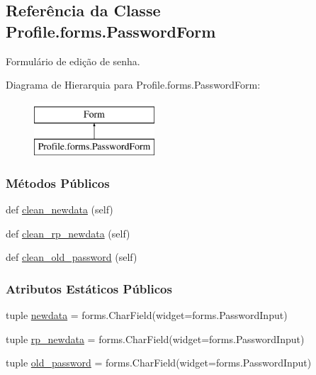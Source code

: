 \hypertarget{classProfile_1_1forms_1_1PasswordForm}{}\subsection{Referência da Classe Profile.\+forms.\+Password\+Form}
\label{classProfile_1_1forms_1_1PasswordForm}


Formulário de edição de senha.  


Diagrama de Hierarquia para Profile.\+forms.\+Password\+Form\+:\begin{figure}[H]
\begin{center}
\leavevmode
\includegraphics[height=2.000000cm]{df/dbb/classProfile_1_1forms_1_1PasswordForm}
\end{center}
\end{figure}
\subsubsection*{Métodos Públicos}
\begin{DoxyCompactItemize}
\item 
def \hyperlink{classProfile_1_1forms_1_1PasswordForm_a83f03b77492109e21511fa9e97c475ba}{clean\+\_\+newdata} (self)
\item 
def \hyperlink{classProfile_1_1forms_1_1PasswordForm_aca8f863d0640235058984375c3ff5491}{clean\+\_\+rp\+\_\+newdata} (self)
\item 
def \hyperlink{classProfile_1_1forms_1_1PasswordForm_a77c66c38e78db4ec954c483b50c05f13}{clean\+\_\+old\+\_\+password} (self)
\end{DoxyCompactItemize}
\subsubsection*{Atributos Estáticos Públicos}
\begin{DoxyCompactItemize}
\item 
tuple \hyperlink{classProfile_1_1forms_1_1PasswordForm_a8000a7fa167f74f0cd554f39dd1e3871}{newdata} = forms.\+Char\+Field(widget=forms.\+Password\+Input)
\item 
tuple \hyperlink{classProfile_1_1forms_1_1PasswordForm_a7560db05a7e3dfebdd4e95385192b2ad}{rp\+\_\+newdata} = forms.\+Char\+Field(widget=forms.\+Password\+Input)
\item 
tuple \hyperlink{classProfile_1_1forms_1_1PasswordForm_a71438e4977095210067fd7d2f4cf551c}{old\+\_\+password} = forms.\+Char\+Field(widget=forms.\+Password\+Input)
\end{DoxyCompactItemize}


